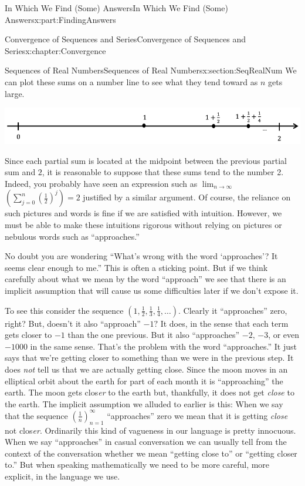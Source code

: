 \begin{partptx}{In Which We Find (Some) Answers}{}{In Which We Find (Some) Answers}{}{}{x:part:FindingAnswers}
\begin{chapterptx}{Convergence of Sequences and Series}{}{Convergence of Sequences and Series}{}{}{x:chapter:Convergence}
\begin{sectionptx}{Sequences of Real Numbers}{}{Sequences of Real Numbers}{}{}{x:section:SeqRealNum}
			We can plot these sums on a number line to see what they tend toward as \(n\) gets large.%
			\begin{image}{0.08}{0.84}{0.08}%
				\includegraphics[width=\linewidth]{external/images/NumberLine.png}
			\end{image}%
			Since each partial sum is located at the midpoint between the previous partial sum and \(2\), it is reasonable to suppose that these sums tend to the number 2. Indeed, you probably have seen an expression such as \(\lim_{n\rightarrow\infty}\) \(\left(\sum_{j=0}^n\left(\frac{1}{2}\right)^j\right)=2\) justified by a similar argument. Of course, the reliance on such pictures and words is fine if we are satisfied with intuition. However, we must be able to make these intuitions rigorous without relying on pictures or nebulous words such as ``approaches.''%
			\par
			No doubt you are wondering ``What's wrong with the word `approaches'? It seems clear enough to me.'' This is often a sticking point. But if we think carefully about what we mean by the word ``approach'' we see that there is an implicit assumption that will cause us some difficulties later if we don't expose it.%
			\par
			To see this consider the sequence \(\left(1,\frac12,\frac13,\frac14,\ldots\right)\). Clearly it ``approaches'' zero, right? But, doesn't it also ``approach'' \(-1?\) It does, in the sense that each term gets closer to \(-1\) than the one previous. But it also ``approaches'' \(-2\), \(-3\), or even \(-1000\) in the same sense. That's the problem with the word ``approaches.'' It just says that we're getting closer to something than we were in the previous step. It does \emph{not} tell us that we are actually getting close. Since the moon moves in an elliptical orbit about the earth for part of each month it is ``approaching'' the earth. The moon gets clos\emph{er} to the earth but, thankfully, it does not get \emph{close} to the earth. The implicit assumption we alluded to earlier is this: When we say that the sequence \(\left(\frac1n\right)_{n=1}^\infty\) ``approaches'' zero we mean that it is getting \emph{close} not clos\emph{er}. Ordinarily this kind of vagueness in our language is pretty innocuous. When we say ``approaches'' in casual conversation we can usually tell from the context of the conversation whether we mean ``getting close to'' or ``getting closer to.'' But when speaking mathematically we need to be more careful, more explicit, in the language we use.%

\end{sectionptx}
\end{chapterptx}
\end{partptx}
